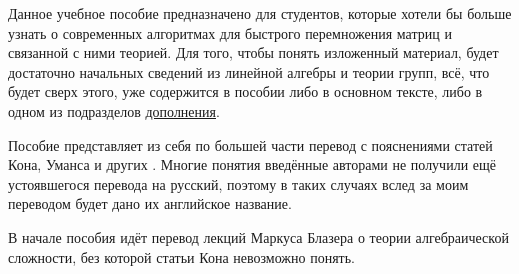 Данное учебное пособие предназначено для студентов, которые хотели бы больше узнать о современных алгоритмах для быстрого перемножения матриц и связанной с ними теорией. Для того, чтобы понять изложенный материал, будет достаточно начальных сведений из линейной алгебры и теории групп, всё, что будет сверх этого, уже содержится в пособии либо в основном тексте, либо в одном из подразделов \hyperref[appendix]{дополнения}.

Пособие представляет из себя по большей части перевод с пояснениями статей Кона, Уманса и других \cite{Cohn03,Cohn05,Cohn12}. Многие понятия введённые авторами не получили ещё устоявшегося перевода на русский, поэтому в таких случаях вслед за моим переводом будет дано их английское название. 

В начале пособия идёт перевод лекций Маркуса Блазера \cite{Lecture} о теории алгебраической сложности, без которой статьи Кона невозможно понять. 

